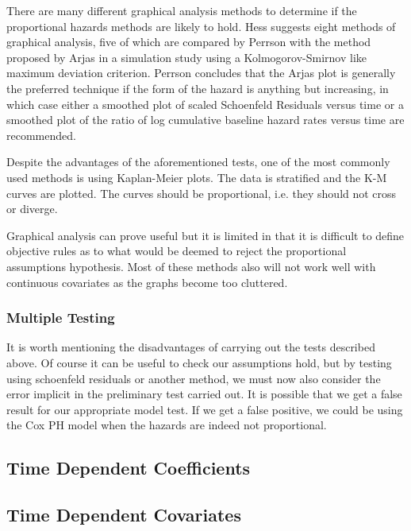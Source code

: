 There are many different graphical analysis methods to determine if the proportional hazards methods are likely to hold. Hess  suggests eight methods of graphical analysis, five of which are compared by Perrson  with the method proposed by Arjas  in a simulation study using a Kolmogorov-Smirnov like maximum deviation criterion. Perrson  concludes that the Arjas plot is generally the preferred technique if the form of the hazard is anything but increasing, in which case either a smoothed plot of scaled
Schoenfeld Residuals versus time or a smoothed plot of the ratio of
log cumulative baseline hazard rates versus time are recommended.

Despite the advantages of the aforementioned tests, one of the most commonly used methods is using Kaplan-Meier plots. The data is stratified and the K-M curves are plotted. The curves should be proportional, i.e. they should not cross or diverge.  

Graphical analysis can prove useful but it is limited in that it is difficult to define objective rules as to what would be deemed to reject the proportional assumptions hypothesis. Most of these methods also will not work well with continuous covariates as the graphs become too cluttered.


\subsubsection{Multiple Testing}

It is worth mentioning the disadvantages of carrying out the tests described above. Of course it can be useful to check our assumptions hold, but by testing using schoenfeld residuals or another method, we must now also consider the error implicit in the preliminary test carried out. It is possible that we get a false result for our appropriate model test. If we get a false positive, we could be using the Cox PH model when the hazards are indeed not proportional. 

\subsection{Time Dependent Coefficients}

\subsection{Time Dependent Covariates}

